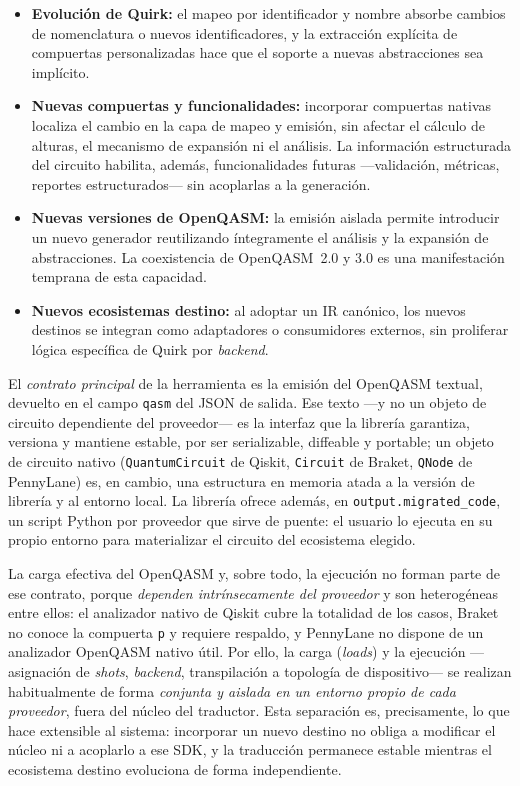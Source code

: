 \documentclass[11pt,a4paper]{article}
\newcommand{\code}[1]{\texttt{#1}}
\begin{document}
\begin{itemize}[leftmargin=1.6em]
  \item \textbf{Evolución de Quirk:} el mapeo por identificador y nombre absorbe cambios de
        nomenclatura o nuevos identificadores, y la extracción explícita de compuertas
        personalizadas hace que el soporte a nuevas abstracciones sea implícito.
  \item \textbf{Nuevas compuertas y funcionalidades:} incorporar compuertas nativas localiza
        el cambio en la capa de mapeo y emisión, sin afectar el cálculo de alturas, el
        mecanismo de expansión ni el análisis. La información estructurada del circuito
        habilita, además, funcionalidades futuras ---validación, métricas, reportes
        estructurados--- sin acoplarlas a la generación.
  \item \textbf{Nuevas versiones de OpenQASM:} la emisión aislada permite introducir un nuevo
        generador reutilizando íntegramente el análisis y la expansión de abstracciones. La
        coexistencia de OpenQASM~2.0 y 3.0 es una manifestación temprana de esta capacidad.
  \item \textbf{Nuevos ecosistemas destino:} al adoptar un IR canónico, los nuevos destinos
        se integran como adaptadores o consumidores externos, sin proliferar lógica específica
        de Quirk por \emph{backend}.
\end{itemize}

El \emph{contrato principal} de la herramienta es la emisión del OpenQASM textual, devuelto
en el campo \code{qasm} del JSON de salida. Ese texto ---y no un objeto de circuito
dependiente del proveedor--- es la interfaz que la librería garantiza, versiona y mantiene
estable, por ser serializable, diffeable y portable; un objeto de circuito nativo
(\code{QuantumCircuit} de Qiskit, \code{Circuit} de Braket, \code{QNode} de PennyLane) es,
en cambio, una estructura en memoria atada a la versión de librería y al entorno local. La
librería ofrece además, en \code{output.migrated\_code}, un script Python por proveedor que
sirve de puente: el usuario lo ejecuta en su propio entorno para materializar el circuito
del ecosistema elegido.

La carga efectiva del OpenQASM y, sobre todo, la ejecución no forman parte de ese contrato,
porque \emph{dependen intrínsecamente del proveedor} y son heterogéneas entre ellos: el
analizador nativo de Qiskit cubre la totalidad de los casos, Braket no conoce la compuerta
\code{p} y requiere respaldo, y PennyLane no dispone de un analizador OpenQASM nativo útil.
Por ello, la carga (\emph{loads}) y la ejecución ---asignación de \emph{shots},
\emph{backend}, transpilación a topología de dispositivo--- se realizan habitualmente de forma
\emph{conjunta y aislada en un entorno propio de cada proveedor}, fuera del núcleo del
traductor. Esta separación es, precisamente, lo que hace extensible al sistema: incorporar un
nuevo destino no obliga a modificar el núcleo ni a acoplarlo a ese SDK, y la traducción
permanece estable mientras el ecosistema destino evoluciona de forma independiente.
\end{document}
